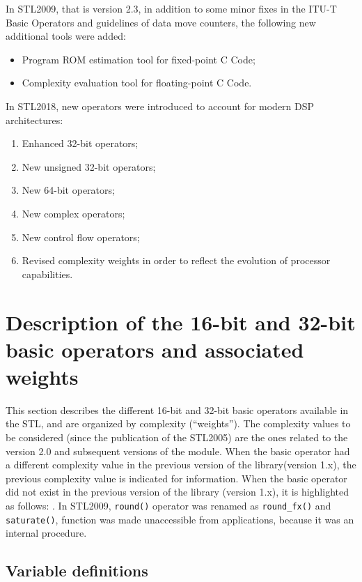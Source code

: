 In STL2009, that is version 2.3, in addition to some minor fixes in the ITU-T Basic Operators and guidelines of data move counters, the following new additional tools were added:
\begin{itemize}
    \item Program ROM estimation tool for fixed-point C Code;
    \item Complexity evaluation tool for floating-point C Code.
\end{itemize}

In STL2018, new operators were introduced to account for modern DSP architectures:
\begin{enumerate}
    \item Enhanced 32-bit operators;
    \item New unsigned 32-bit operators;
    \item New 64-bit operators;
    \item New complex operators;
    \item New control flow operators;
    \item Revised complexity weights in order to reflect the evolution of processor capabilities.
\end{enumerate}

\section{Description of the 16-bit and 32-bit basic operators and associated weights}

This section describes the different 16-bit and 32-bit basic operators available in the STL, and are organized by complexity (``weights'').
The complexity values to be considered (since the publication of the STL2005) are the ones related to the version 2.0 and subsequent versions of the module.
When the basic operator had a different complexity value in the previous version of the library(version 1.x), the previous complexity value is indicated for information.
When the basic operator did not exist in the previous version of the library (version 1.x), it is highlighted as follows:
 . In STL2009, {\tt round()} operator was renamed as {\tt round\_fx()} and {\tt saturate()}, function was made unaccessible from applications, because it was an internal procedure.

\subsection{Variable definitions}


